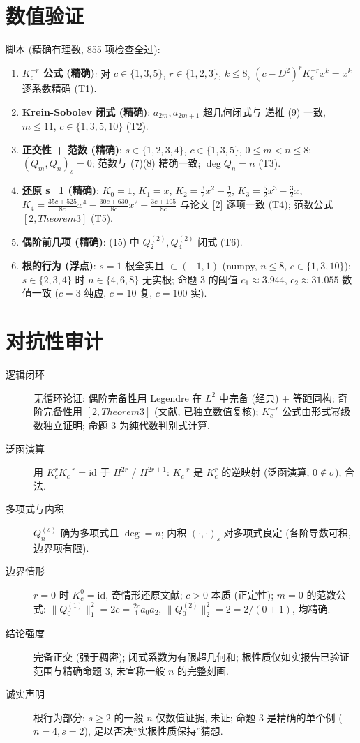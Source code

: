 \documentclass[UTF8]{ctexart}
\begin{document}
\section{数值验证}

脚本  (精确有理数, 855 项检查全过):
\begin{enumerate}
	\item \textbf{$K_c^{-r}$ 公式 (精确)}: 对 $c \in \{1,3,5\}$, $r \in \{1,2,3\}$,
		$k \leq 8$, $(c-D^2)^r K_c^{-r} x^k = x^k$ 逐系数精确 (T1).
	\item \textbf{Krein-Sobolev 闭式 (精确)}: $a_{2m}, a_{2m+1}$ 超几何闭式与
		递推 (9) 一致, $m \leq 11$, $c \in \{1,3,5,10\}$ (T2).
	\item \textbf{正交性 + 范数 (精确)}: $s \in \{1,2,3,4\}$, $c \in \{1,3,5\}$,
		$0 \leq m < n \leq 8$: $(Q_m, Q_n)_s = 0$; 范数与 (7)(8) 精确一致;
		$\deg Q_n = n$ (T3).
	\item \textbf{还原 s=1 (精确)}: $K_0 = 1$, $K_1 = x$, $K_2 = \frac32 x^2
		- \frac12$, $K_3 = \frac52 x^3 - \frac32 x$, $K_4 =
		\frac{35c+525}{8c}x^4 - \frac{30c+630}{8c}x^2 + \frac{3c+105}{8c}$
		与论文 [2] 逐项一致 (T4); 范数公式 $[2, Theorem 3]$ (T5).
	\item \textbf{偶阶前几项 (精确)}: (15) 中 $Q_2^{(2)}, Q_4^{(2)}$ 闭式 (T6).
	\item \textbf{根的行为 (浮点)}: $s=1$ 根全实且 $\subset (-1,1)$
		(numpy, $n \leq 8$, $c \in \{1,3,10\}$); $s \in \{2,3,4\}$ 时
		$n \in \{4,6,8\}$ 无实根; 命题 3 的阈值 $c_1 \approx 3.944$,
		$c_2 \approx 31.055$ 数值一致 ($c=3$ 纯虚, $c=10$ 复, $c=100$ 实).
\end{enumerate}

\section{对抗性审计}

\begin{description}
	\item[逻辑闭环] 无循环论证: 偶阶完备性用 Legendre 在 $L^2$ 中完备
		(经典) + 等距同构; 奇阶完备性用 $[2, Theorem 3]$ (文献, 已独立数值复核);
		$K_c^{-r}$ 公式由形式幂级数独立证明; 命题 3 为纯代数判别式计算.
	\item[泛函演算] 用 $K_c^r K_c^{-r} = \mathrm{id}$ 于 $H^{2r}$ /
		$H^{2r+1}$: $K_c^{-r}$ 是 $K_c^r$ 的逆映射 (泛函演算, $0 \notin \sigma$),
		合法.
	\item[多项式与内积] $Q_n^{(s)}$ 确为多项式且 $\deg = n$; 内积
		$(\cdot,\cdot)_s$ 对多项式良定 (各阶导数可积, 边界项有限).
	\item[边界情形] $r = 0$ 时 $K_c^0 = \mathrm{id}$, 奇情形还原文献;
		$c > 0$ 本质 (正定性); $m=0$ 的范数公式: $\|Q_0^{(1)}\|_1^2 = 2c
		= \frac{2c}{1}a_0a_2$, $\|Q_0^{(2)}\|_2^2 = 2 = 2/(0+1)$, 均精确.
	\item[结论强度] 完备正交 (强于稠密); 闭式系数为有限超几何和;
		根性质仅如实报告已验证范围与精确命题 3, 未宣称一般 $n$ 的完整刻画.
	\item[诚实声明] 根行为部分: $s \geq 2$ 的一般 $n$ 仅数值证据, 未证;
		命题 3 是精确的单个例 ($n=4, s=2$), 足以否决``实根性质保持''猜想.
\end{description}
\end{document}
